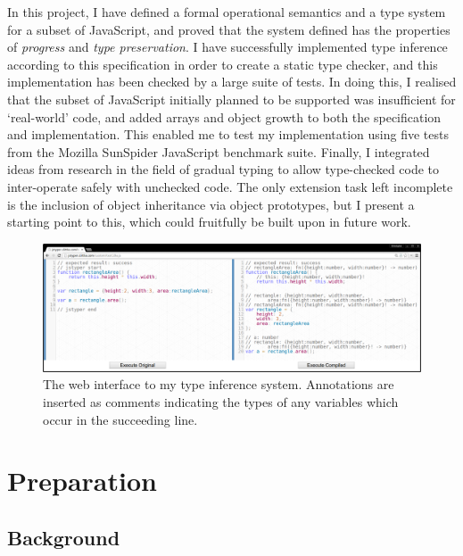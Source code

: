 \documentclass[12pt,a4paper,twoside,openright]{report}
\theoremstyle{definition}
\theoremstyle{dotless}
\begin{document}
In this project, I have defined a formal operational semantics and a type
system for a subset of JavaScript, and proved that the system defined
has the properties of \textit{progress} and \textit{type preservation}. I have
successfully implemented type inference according to this specification in
order to create a static type checker, and this implementation has been checked
by a large suite of tests. In doing this, I realised that the subset of
JavaScript initially planned to be supported was insufficient for `real-world'
code, and added arrays and object growth to both the specification and
implementation. This enabled me to test my implementation using five tests from
the Mozilla SunSpider JavaScript benchmark suite. Finally, I integrated ideas
from research in the field of gradual typing to allow type-checked code to
inter-operate safely with unchecked code. The only extension task left
incomplete is the inclusion of object inheritance via object prototypes, but I
present a starting point to this, which could fruitfully be built upon in
future work.

\begin{figure}
  \centering
  \includegraphics[width=160mm]{../res/web-interface.png}
  \caption[The web interface to my type inference system]{The web interface to my type inference system. Annotations are inserted as comments indicating the 
  	types of any variables which occur in the succeeding line.}
  \label{fig:web-interface}
\end{figure}






\chapter{Preparation}\label{preparation} 
\section{Background}
\end{document}
